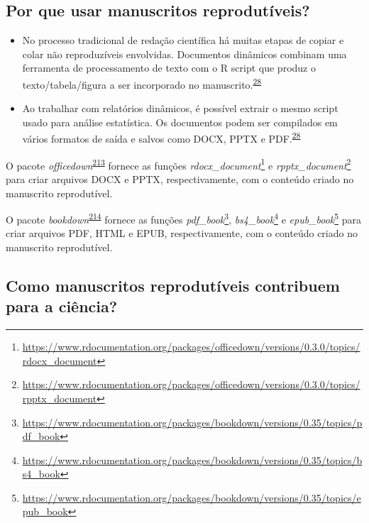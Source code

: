\documentclass[
  a4paper,
]{book}
\renewcommand{\href}[2]{#2\footnote{\url{#1}}}
\newenvironment{infobox}[1]
  {
  \begin{itemize}
  \renewcommand{\labelitemi}{
    \raisebox{-.7\height}[0pt][0pt]{
      {\setkeys{Gin}{width=3em,keepaspectratio}
        \texttt{[image: \#1]}}
    }
  }
  \setlength{\fboxsep}{1em}
  \begin{blackbox}
  \item
  }
  {
  \end{blackbox}
  \end{itemize}
  }
\begin{document}
\hypertarget{por-que-usar-manuscritos-reprodutuxedveis}{%
\subsection{Por que usar manuscritos reprodutíveis?}\label{por-que-usar-manuscritos-reprodutuxedveis}}

\begin{itemize}
\item
  No processo tradicional de redação científica há muitas etapas de copiar e colar não reproduzíveis envolvidas. Documentos dinâmicos combinam uma ferramenta de processamento de texto com o R script que produz o texto/tabela/figura a ser incorporado no manuscrito.\textsuperscript{\protect\hyperlink{ref-mair2016}{28}}
\item
  Ao trabalhar com relatórios dinâmicos, é possível extrair o mesmo script usado para análise estatística. Os documentos podem ser compilados em vários formatos de saída e salvos como DOCX, PPTX e PDF.\textsuperscript{\protect\hyperlink{ref-mair2016}{28}}
\end{itemize}

\begin{infobox}{images/Rlogo}
O pacote \emph{officedown}\textsuperscript{\protect\hyperlink{ref-officedown}{213}} fornece as funções \href{https://www.rdocumentation.org/packages/officedown/versions/0.3.0/topics/rdocx_document}{\emph{rdocx\_document}} e \href{https://www.rdocumentation.org/packages/officedown/versions/0.3.0/topics/rpptx_document}{\emph{rpptx\_document}} para criar arquivos DOCX e PPTX, respectivamente, com o conteúdo criado no manuscrito reprodutível.

\end{infobox}

\begin{infobox}{images/Rlogo}
O pacote \emph{bookdown}\textsuperscript{\protect\hyperlink{ref-bookdown}{214}} fornece as funções \href{https://www.rdocumentation.org/packages/bookdown/versions/0.35/topics/pdf_book}{\emph{pdf\_book}}, \href{https://www.rdocumentation.org/packages/bookdown/versions/0.35/topics/bs4_book}{\emph{bs4\_book}} e \href{https://www.rdocumentation.org/packages/bookdown/versions/0.35/topics/epub_book}{\emph{epub\_book}} para criar arquivos PDF, HTML e EPUB, respectivamente, com o conteúdo criado no manuscrito reprodutível.

\end{infobox}

\hypertarget{como-manuscritos-reprodutuxedveis-contribuem-para-a-ciuxeancia}{%
\subsection{Como manuscritos reprodutíveis contribuem para a ciência?}\label{como-manuscritos-reprodutuxedveis-contribuem-para-a-ciuxeancia}}
\end{document}
